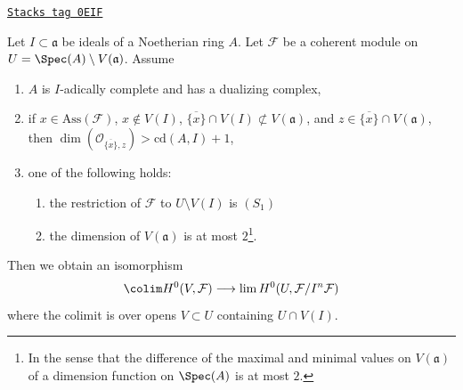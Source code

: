 \begin{lemma}
\label{algebraization-lemma-application-H0-pre}
\href{https://stacks.math.columbia.edu/tag/0EIF}{\texttt{Stacks tag 0EIF}}

Let $I \subset \mathfrak a$ be ideals of a Noetherian ring $A$.
Let $\mathcal{F}$ be a coherent module on
$U = \Spec(A) \setminus V(\mathfrak a)$.
Assume
\begin{enumerate}
\item $A$ is $I$-adically complete and has a dualizing complex,
\item if $x \in \text{Ass}(\mathcal{F})$, $x \not \in V(I)$,
$\overline{\{x\}} \cap V(I) \not \subset V(\mathfrak a)$,
and $z \in \overline{\{x\}} \cap V(\mathfrak a)$, then
$\dim(\mathcal{O}_{\overline{\{x\}}, z}) > \text{cd}(A, I) + 1$,
\item one of the following holds:
\begin{enumerate}
\item the restriction of $\mathcal{F}$ to $U \setminus V(I)$ is $(S_1)$
\item the dimension of $V(\mathfrak a)$ is at most $2$\footnote{In
the sense that the difference of the maximal and minimal values
on $V(\mathfrak a)$ of a dimension function on $\Spec(A)$ is at most $2$.}.
\end{enumerate}
\end{enumerate}
Then we obtain an isomorphism
$$
\colim H^0(V, \mathcal{F})
\longrightarrow
\lim H^0(U, \mathcal{F}/I^n\mathcal{F})
$$
where the colimit is over opens $V \subset U$ containing $U \cap V(I)$.
\end{lemma}

